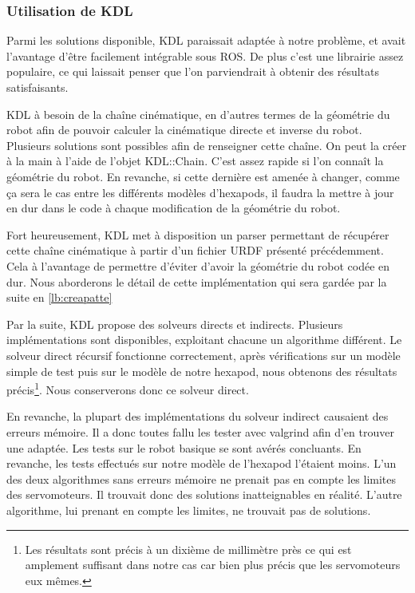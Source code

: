 \documentclass{tnreport}
\begin{document}
\subsubsection{Utilisation de KDL}
 Parmi les solutions disponible, \gls{KDL} paraissait adaptée à notre problème, et avait l'avantage d'être facilement intégrable sous ROS. De plus c'est une librairie assez populaire, ce qui laissait penser que l'on parviendrait à obtenir des résultats satisfaisants. 
 
\label{lb:extract}\gls{KDL} à besoin de la chaîne cinématique, en d'autres termes de la géométrie du robot afin de pouvoir calculer la cinématique directe et inverse du robot. Plusieurs solutions sont possibles afin de renseigner cette chaîne. On peut la créer à la main à l'aide de l'objet KDL::Chain. C'est assez rapide si l'on connaît la géométrie du robot. En revanche, si cette dernière est amenée à changer, comme ça sera le cas entre les différents modèles d'hexapods, il faudra la mettre à jour en dur dans le code à chaque modification de la géométrie du robot. 

Fort heureusement, KDL met à disposition un parser permettant de récupérer cette chaîne cinématique à partir d'un fichier URDF présenté précédemment. Cela à l'avantage de permettre d'éviter d'avoir la géométrie du robot codée en dur. Nous aborderons le détail de cette implémentation qui sera gardée par la suite en \ref{lb:creapatte} 

Par la suite, KDL propose des solveurs directs et indirects. Plusieurs implémentations sont disponibles, exploitant chacune un algorithme différent. Le solveur direct récursif fonctionne correctement, après vérifications sur un modèle simple de test puis sur le modèle de notre hexapod, nous obtenons des résultats précis\footnote{Les résultats sont précis à un dixième de millimètre près ce qui est amplement suffisant dans notre cas car bien plus précis que les servomoteurs eux mêmes.}. Nous conserverons donc ce solveur direct.

En revanche, la plupart des implémentations du solveur indirect causaient des erreurs mémoire. Il a donc toutes fallu les tester avec valgrind afin d'en trouver une adaptée. Les tests sur le robot basique se sont avérés concluants. En revanche, les tests effectués sur notre modèle de l'hexapod l'étaient moins. L'un des deux algorithmes sans erreurs mémoire ne prenait pas en compte les limites des servomoteurs. Il trouvait donc des solutions inatteignables en réalité. L'autre algorithme, lui prenant en compte les limites, ne trouvait pas de solutions. 
\end{document}
